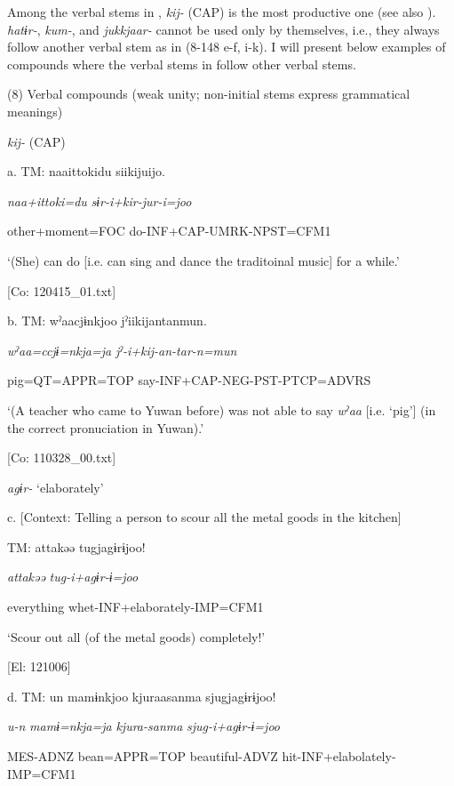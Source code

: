 Among the verbal stems in , \textit{kij-} (CAP) is the most productive one (see also ). \textit{hatɨr-}, \textit{kum-}, and \textit{jukkjaar-} cannot be used only by themselves, i.e., they always follow another verbal stem as in (8-148 e-f, i-k). I will present below examples of compounds where the verbal stems in  follow other verbal stems.

(8)  Verbal compounds (weak unity; non-initial stems express grammatical meanings)

  \textit{kij-} (CAP)

  a.  TM:  naa{\textbar}ittoki{\textbar}du  siikijuijo.

      \textit{naa+ittoki=du}  \textit{sɨr-i+kir{}-jur-i=joo}

      other+moment=FOC  do-INF+CAP-UMRK-NPST=CFM1

      ‘(She) can do [i.e. can sing and dance the traditoinal music] for a while.’

      [Co: 120415\_01.txt]

  b.  TM:  wˀaacjɨnkjoo  jˀiikijantanmun.

      \textit{wˀaa=ccjɨ=nkja=ja}  \textit{jˀ-i+kij{}-an-tar-n=mun}

      pig=QT=APPR=TOP  say-INF+CAP-NEG-PST-PTCP=ADVRS

      ‘(A teacher who came to Yuwan before) was not able to say \textit{wˀaa} [i.e. ‘pig’] (in the correct pronuciation in Yuwan).’

      [Co: 110328\_00.txt]

  \textit{agɨr-} ‘elaborately’

  c.  [Context: Telling a person to scour all the metal goods in the kitchen]

    TM:  attakəə  tugjagɨrɨjoo!

      \textit{attakəə}  \textit{tug-i+agɨr{}-ɨ=joo}

      everything  whet-INF+elaborately-IMP=CFM1

      ‘Scour out all (of the metal goods) completely!’

      [El: 121006]

  d.  TM:  un  mamɨnkjoo  kjuraasanma  sjugjagɨrɨjoo!

      \textit{u-n}  \textit{mamɨ=nkja=ja}  \textit{kjura-sanma}  \textit{sjug-i+agɨr{}-ɨ=joo}

      MES-ADNZ  bean=APPR=TOP  beautiful{}-ADVZ  hit{}-INF+elabolately{}-IMP=CFM1

